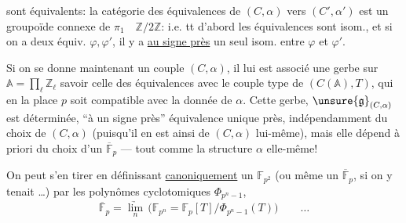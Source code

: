 
sont équivalents: la catégorie des équivalences de $(C,\alpha)$ vers $(C',\alpha')$ est un groupoïde connexe de $\pi_1\quad\mathbb Z/2\mathbb Z$:
i.e. tt d'abord les équivalences sont isom., et si on a deux équiv. $\varphi,\varphi'$, il y a \uline{au signe près} un seul isom. entre $\varphi$ et $\varphi'$.

Si on se donne maintenant un couple $(C,\alpha)$, il lui est associé une  gerbe sur
$\mathbb A=\prod_\ell\mathbb Z_\ell$ 
savoir celle des équivalences  avec le  couple type de $(C(\mathbb A),T)$, qui en la place $p$ soit compatible avec la donnée de $\alpha$.
Cette gerbe, $\unsure{\mathfrak g}_{(C,\alpha)}$ est déterminée, ``à un signe près''  équivalence unique près, indépendamment du choix de $(C,\alpha)$ (puisqu'il en est ainsi de $(C,\alpha)$ lui-même), 
mais elle dépend à priori  du choix d'un $\overline{\mathbb F}_p$
--- tout comme la structure $\alpha$ elle-même!


On peut s'en tirer en définissant \uline{canoniquement} un $\mathbb F_{p^2}$ (ou même un $\overline{\mathbb F}_p$, si on y tenait \ldots) par les polynômes cyclotomiques $\Phi_{p^n-1}$,
\[
\overline{\mathbb F}_p=
\underset{n}{\underrightarrow{\lim}}\,
\bigl(\mathbb F_{p^n}=\mathbb F_p[T]/\Phi_{p^n-1}(T)\bigr)
\qquad\ldots
\]

